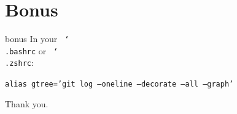 \documentclass[usenames,dvipsnames,9pt]{beamer}
\begin{document}
%
%
\section{Bonus}


\begin{frame}[fragile]{bonus}
  In your \texttt{~\char`\\.bashrc} or \texttt{~\char`\\.zshrc}:

  \texttt{alias gtree='git log --oneline --decorate --all --graph'}
\end{frame}


\begin{frame}[standout]
Thank you.
\end{frame}
\end{document}
